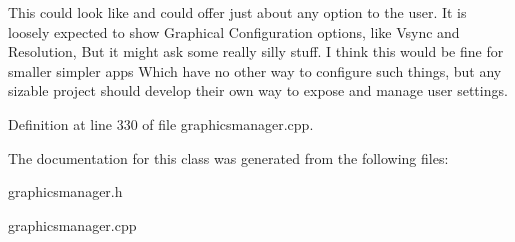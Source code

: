 This could look like and could offer just about any option to the user. It is loosely expected to show Graphical Configuration options, like Vsync and Resolution, But it might ask some really silly stuff. I think this would be fine for smaller simpler apps Which have no other way to configure such things, but any sizable project should develop their own way to expose and manage user settings. 

Definition at line 330 of file graphicsmanager.cpp.



The documentation for this class was generated from the following files:\begin{DoxyCompactItemize}
\item 
graphicsmanager.h\item 
graphicsmanager.cpp\end{DoxyCompactItemize}
